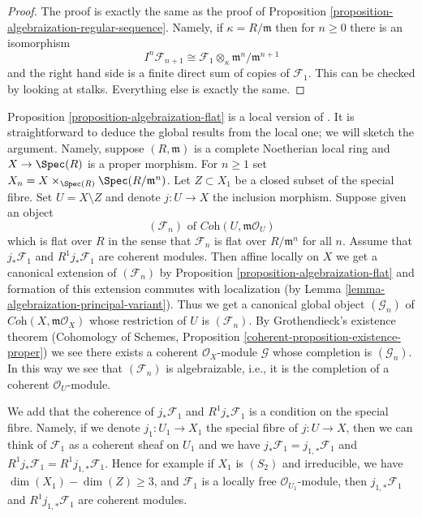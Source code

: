 \begin{proof}
The proof is exactly the same as the proof of
Proposition \ref{proposition-algebraization-regular-sequence}.
Namely, if $\kappa = R/\mathfrak m$ then for $n \geq 0$
there is an isomorphism
$$
I^n \mathcal{F}_{n + 1} \cong
\mathcal{F}_1 \otimes_\kappa \mathfrak m^n/\mathfrak m^{n + 1}
$$
and the right hand side is a finite direct sum of copies
of $\mathcal{F}_1$. This can be checked by looking at stalks.
Everything else is exactly the same.
\end{proof}

\begin{remark}
\label{remark-interesting-case-quater}
Proposition \ref{proposition-algebraization-flat} is a local version
of \cite[Theorem 2.10 (i)]{Baranovsky}. It is straightforward to deduce
the global results from the local one; we will sketch the argument.
Namely, suppose $(R, \mathfrak m)$
is a complete Noetherian local ring and $X \to \Spec(R)$ is a proper morphism.
For $n \geq 1$ set $X_n = X \times_{\Spec(R)} \Spec(R/\mathfrak m^n)$.
Let $Z \subset X_1$ be a closed subset of the special fibre.
Set $U = X \setminus Z$ and denote $j : U \to X$ the inclusion morphism.
Suppose given an object
$$
(\mathcal{F}_n) \text{ of } \textit{Coh}(U, \mathfrak m\mathcal{O}_U)
$$
which is flat over $R$ in the sense that $\mathcal{F}_n$ is flat over
$R/\mathfrak m^n$ for all $n$.
Assume that $j_*\mathcal{F}_1$ and $R^1j_*\mathcal{F}_1$ are coherent
modules. Then affine locally on $X$ we get a canonical extension
of $(\mathcal{F}_n)$ by
Proposition \ref{proposition-algebraization-flat}
and formation of this extension commutes with localization
(by Lemma \ref{lemma-algebraization-principal-variant}).
Thus we get a canonical global object $(\mathcal{G}_n)$ of
$\textit{Coh}(X, \mathfrak m\mathcal{O}_X)$
whose restriction of $U$ is $(\mathcal{F}_n)$.
By Grothendieck's existence theorem
(Cohomology of Schemes, Proposition
\ref{coherent-proposition-existence-proper})
we see there exists a coherent $\mathcal{O}_X$-module
$\mathcal{G}$ whose completion is $(\mathcal{G}_n)$.
In this way we see that $(\mathcal{F}_n)$ is algebraizable, i.e.,
it is the completion of a coherent $\mathcal{O}_U$-module.

\medskip\noindent
We add that the coherence of $j_*\mathcal{F}_1$ and $R^1j_*\mathcal{F}_1$
is a condition on the special fibre. Namely, if we denote
$j_1 : U_1 \to X_1$ the special fibre of $j : U \to X$, then we can
think of $\mathcal{F}_1$ as a coherent sheaf on $U_1$ and we have
$j_*\mathcal{F}_1 = j_{1, *}\mathcal{F}_1$ and
$R^1j_*\mathcal{F}_1 = R^1j_{1, *}\mathcal{F}_1$.
Hence for example if $X_1$ is $(S_2)$ and irreducible, we have
$\dim(X_1) - \dim(Z) \geq 3$, and $\mathcal{F}_1$ is a locally free
$\mathcal{O}_{U_1}$-module, then $j_{1, *}\mathcal{F}_1$ and
$R^1j_{1, *}\mathcal{F}_1$ are coherent modules.
\end{remark}








